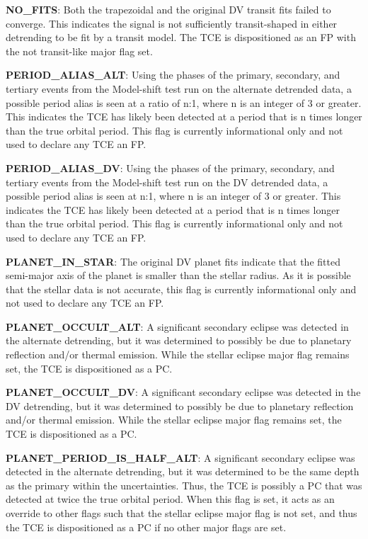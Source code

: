 \textbf{NO\_FITS}: Both the trapezoidal and the original DV transit fits failed to converge. This indicates the signal is not sufficiently transit-shaped in either detrending to be fit by a transit model. The TCE is dispositioned as an FP with the not transit-like major flag set.

\textbf{PERIOD\_ALIAS\_ALT}: Using the phases of the primary, secondary, and tertiary events from the Model-shift test run on the alternate detrended data, a possible period alias is seen at a ratio of n:1, where n is an integer of 3 or greater. This indicates the TCE has likely been detected at a period that is n times longer than the true orbital period. This flag is currently informational only and not used to declare any TCE an FP.

\textbf{PERIOD\_ALIAS\_DV}: Using the phases of the primary, secondary, and tertiary events from the Model-shift test run on the DV detrended data, a possible period alias is seen at n:1, where n is an integer of 3 or greater. This indicates the TCE has likely been detected at a period that is n times longer than the true orbital period. This flag is currently informational only and not used to declare any TCE an FP.

\textbf{PLANET\_IN\_STAR}: The original DV planet fits indicate that the fitted semi-major axis of the planet is smaller than the stellar radius. As it is possible that the stellar data is not accurate, this flag is currently informational only and not used to declare any TCE an FP.

\textbf{PLANET\_OCCULT\_ALT}: A significant secondary eclipse was detected in the alternate detrending, but it was determined to possibly be due to planetary reflection and/or thermal emission. While the stellar eclipse major flag remains set, the TCE is dispositioned as a PC.

\textbf{PLANET\_OCCULT\_DV}: A significant secondary eclipse was detected in the DV detrending, but it was determined to possibly be due to planetary reflection and/or thermal emission. While the stellar eclipse major flag remains set, the TCE is dispositioned as a PC.

\textbf{PLANET\_PERIOD\_IS\_HALF\_ALT}: A significant secondary eclipse was detected in the alternate detrending, but it was determined to be the same depth as the primary within the uncertainties. Thus, the TCE is possibly a PC that was detected at twice the true orbital period. When this flag is set, it acts as an override to other flags such that the stellar eclipse major flag is not set, and thus the TCE is dispositioned as a PC if no other major flags are set.

